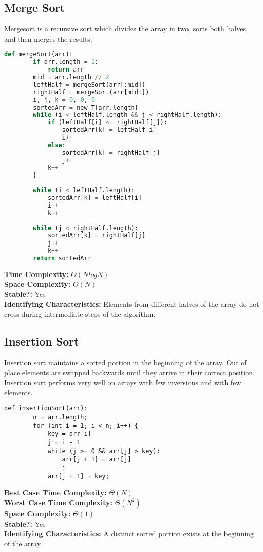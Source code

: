 \documentclass{article}
\begin{document}
\subsection{Merge Sort}
Mergesort is a recursive sort which divides the array in two, sorts both halves, and then merges the results.
\begin{lstlisting}[language=Python]
    def mergeSort(arr):
        if arr.length = 1:
            return arr
        mid = arr.length // 2
        leftHalf = mergeSort(arr[:mid])
        rightHalf = mergeSort(arr[mid:])
        i, j, k = 0, 0, 0
        sortedArr = new T[arr.length]
        while (i < leftHalf.length && j < rightHalf.length):
            if (leftHalf[i] <= rightHalf[j]): 
                sortedArr[k] = leftHalf[i] 
                i++
            else:
                sortedArr[k] = rightHalf[j] 
                j++
            k++
        } 
    
        while (i < leftHalf.length):
            sortedArr[k] = leftHalf[i]
            i++
            k++
    
        while (j < rightHalf.length): 
            sortedArr[k] = rightHalf[j]
            j++
            k++
        return sortedArr
\end{lstlisting}
\textbf{Time Complexity: } $\Theta(NlogN)$\\
\textbf{Space Complexity: } $\Theta(N)$\\
\textbf{Stable?: } Yes\\
\textbf{Identifying Characteristics: } Elements from different halves of the array do not cross during intermediate steps of the algorithm.
\subsection{Insertion Sort}
Insertion sort maintains a sorted portion in the beginning of the array. Out of place elements are swapped backwards until they arrive in their correct position.
Insertion sort performs very well on arrays with few inversions and with few elements.
\begin{lstlisting}[]
    def insertionSort(arr):
        n = arr.length; 
        for (int i = 1; i < n; i++) { 
            key = arr[i]
            j = i - 1
            while (j >= 0 && arr[j] > key):
                arr[j + 1] = arr[j]
                j--
            arr[j + 1] = key; 
\end{lstlisting}
\textbf{Best Case Time Complexity: } $\Theta(N)$\\
\textbf{Worst Case Time Complexity: } $\Theta(N^2)$\\
\textbf{Space Complexity: } $\Theta(1)$\\
\textbf{Stable?: } Yes\\
\textbf{Identifying Characteristics: } A distinct sorted portion exists at the beginning of the array.
\end{document}
